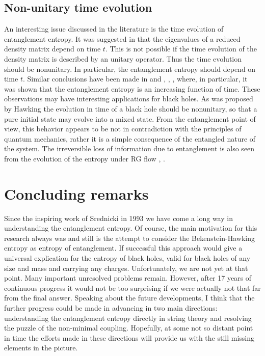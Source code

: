 \documentclass[12pt]{article}
\begin{document}
\subsection{Non-unitary time evolution }  

An interesting issue discussed in the literature is the time evolution of entanglement entropy. It was suggested in 
\cite{Brustein:2006wp} that the eigenvalues of a reduced density matrix depend on time $t$. This is not possible if the time evolution
of the density matrix is described by an unitary operator. Thus the time evolution  should be nonunitary. In particular, the entanglement entropy 
should depend on time $t$. Similar conclusions  have been made in
\cite{Calabrese:2005in} and \cite{Koksma:2010zi}, \cite{Koksma:2011fx}, \cite{Koksma:2011dy}, where, in particular, it was shown that the entanglement entropy is an increasing function of time.
These observations may have interesting applications for black holes. As was proposed by Hawking \cite{Hawking:1976ra} the evolution in time of a black hole should be nonunitary, so that a pure initial state 
may evolve into a mixed state. From the entanglement point of view, this behavior appears to be not in contradiction
with the principles of quantum mechanics,  rather it is a simple
consequence of the entangled nature of the system. The irreversible loss of information due to entanglement is also seen from  the evolution of the  entropy under RG flow
\cite{Solodukhin:2006ic}, \cite{Latorre:2004pk}. 




        
\section{Concluding remarks}

Since the inspiring work of Srednicki in 1993 we have come a long way in understanding the entanglement entropy.   Of course, the main motivation for this research  always was and still is the attempt to consider the Bekenstein-Hawking entropy  as entropy of entanglement. If successful this approach would give a universal explication for the entropy of black holes,
valid for black holes of any size and mass  and carrying any charges.  Unfortunately, we are not yet at that point. Many important  unresolved problems remain.
However, after 17 years of 	continuous progress it would not be too surprising if we were actually not that far from  the final answer. Speaking about  the future developments, I think that the further progress could be made in advancing in two main directions: 	understanding the entanglement entropy directly in string theory and  resolving the puzzle of the non-minimal coupling.  Hopefully,   at some not so distant point in time the efforts made in these  directions will  provide us with the still missing elements in the picture.
             
\end{document}
